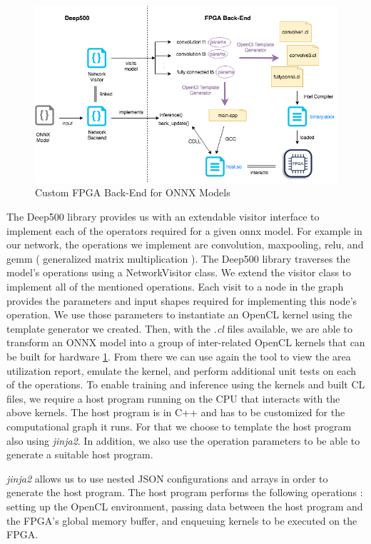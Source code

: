 \begin{figure}[h!]
\centering
\includegraphics[width=1.0\textwidth]{Figures/integration}
\decoRule
\caption[Intergration with Deep500 Diagram]{ Custom FPGA Back-End for ONNX Models }
\label{fig:integration}
\end{figure}

The Deep500 library provides us with an extendable visitor interface to implement each of the operators required for a given onnx model. For example in our network, the operations we implement are convolution, maxpooling, relu, and gemm ( generalized matrix multiplication ). The Deep500 library traverses the model’s operations using a NetworkVisitor class. We extend the visitor class to implement all of the mentioned operations. Each visit to a node in the graph provides the parameters and input shapes required for implementing this node's operation. We use those parameters to instantiate an OpenCL kernel using the template generator we created. Then, with the \emph{.cl} files available, we are able to transform an ONNX model into a group of inter-related OpenCL kernels that can be built for hardware \ref{fig:integration}. From there we can use again the tool to view the area utilization report, emulate the kernel, and perform additional unit tests on each of the operations.
To enable training and inference using the kernels and built CL files, we require a host program running on the CPU that interacts with the above kernels. The host program is in C++ and has to be customized for the computational graph it runs. For that we choose to template the host program also using  \emph{jinja2}. In addition, we also use the operation parameters to be able to generate a suitable host program.  

\emph{jinja2} allows us to use nested JSON configurations and arrays in order to generate the host program. The host program performs the following operations : setting up the OpenCL environment, passing data between the host program and the FPGA's global memory buffer, and enqueuing kernels to be executed on the FPGA.

